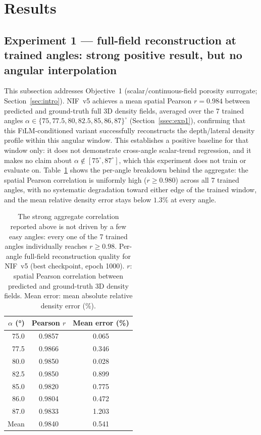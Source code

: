 \documentclass[aip,amsmath,amssymb,reprint]{revtex4-1}
\renewcommand{\ang}{\ensuremath{\alpha}} %
\newcommand{\nif}{\textsc{NIF}}
\newcommand{\film}{\textsc{FiLM}}
\begin{document}
\section{Results}
\label{sec:results}

\subsection{Experiment 1 — full-field reconstruction at trained angles: strong positive result, but no angular interpolation}
\label{ssec:res1}

This subsection addresses Objective~1 (scalar/continuous-field
porosity surrogate; Section~\ref{sec:intro}).
\nif{}~v5 achieves a mean spatial Pearson $r = 0.984$ between
predicted and ground-truth full 3D density fields, averaged over
the 7 trained angles $\ang \in \{75, 77.5, 80, 82.5, 85, 86, 87\}^{\circ}$
(Section~\ref{ssec:exp1}), confirming that this \film{}-conditioned
variant successfully reconstructs the depth/lateral density
profile within this angular window.
This establishes a positive baseline for that window only: it does
not demonstrate cross-angle scalar-trend regression, and it makes
no claim about $\ang \notin [75^{\circ},87^{\circ}]$, which this experiment does
not train or evaluate on.
Table~\ref{tab:nifv5_peralpha} shows the per-angle breakdown behind
the aggregate: the spatial Pearson correlation is uniformly high
($r \geq 0.980$) across all 7 trained angles, with no systematic
degradation toward either edge of the trained window, and the mean
relative density error stays below $1.3\%$ at every angle.

\begin{table}[htbp]
  \centering
  \caption{%
    The strong aggregate correlation reported above is not driven by
    a few easy angles: every one of the 7 trained angles individually
    reaches $r \geq 0.98$.
    Per-angle full-field reconstruction quality for \nif{}~v5
    (best checkpoint, epoch 1000). $r$: spatial Pearson correlation
    between predicted and ground-truth 3D density fields.
    Mean error: mean absolute relative density error (\%).
  }
  \label{tab:nifv5_peralpha}
  \begin{tabular}{rcc}
    \toprule
    $\ang$ (°) & Pearson $r$ & Mean error (\%) \\
    \midrule
    75.0 & 0.9857 & 0.065 \\
    77.5 & 0.9866 & 0.346 \\
    80.0 & 0.9850 & 0.028 \\
    82.5 & 0.9850 & 0.899 \\
    85.0 & 0.9820 & 0.775 \\
    86.0 & 0.9804 & 0.472 \\
    87.0 & 0.9833 & 1.203 \\
    \midrule
    Mean & 0.9840 & 0.541 \\
    \bottomrule
  \end{tabular}
\end{table}
\end{document}
